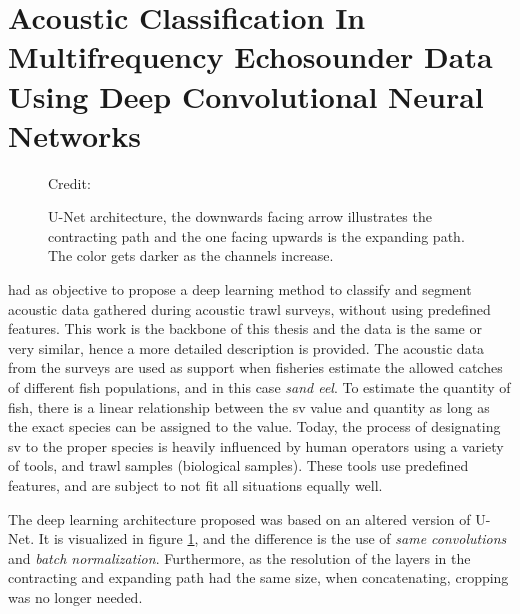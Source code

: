     
\section{Acoustic Classification In Multifrequency Echosounder Data Using Deep Convolutional Neural Networks} \label{unet_paper_acoustic}
    
        \begin{figure}[H]
        \centering
        
        \caption[U-Net architecture]{U-Net architecture, the downwards facing arrow illustrates the contracting path and the one facing upwards is the expanding path. The color gets darker as the channels increase.}
      	\medskip 
        \label{unet__brautset_fig}
        \hspace*{15pt}\hbox{\scriptsize Credit: \citeauthor{brautaset2020acoustic}\cite{brautaset2020acoustic}}
    \end{figure}
    
    
    \citeauthor{brautaset2020acoustic}\cite{brautaset2020acoustic} had as objective to propose a deep learning method to classify and segment acoustic data gathered during acoustic trawl surveys, without using predefined features. This work is the backbone of this thesis and the data is the same or very similar, hence a more detailed description is provided. The acoustic data from the surveys are used as support when fisheries estimate the allowed catches of different fish populations, and in this case \textit{sand eel}. To estimate the quantity of fish, there is a linear relationship between the \gls{sv} value and quantity as long as the exact species can be assigned to the value. Today, the process of designating \gls{sv} to the proper species is heavily influenced by human operators using a variety of tools, and trawl samples (biological samples). These tools use predefined features, and are subject to not fit all situations equally well. 
    
    The deep learning architecture proposed was based on an altered version of \citeauthor{unet_ronneberger2015}\cite{unet_ronneberger2015} U-Net\cite{brautaset2020acoustic}. It is visualized in figure \ref{unet__brautset_fig}, and the difference is the use of \textit{same convolutions} and \textit{batch normalization}. Furthermore, as the resolution of the layers in the contracting and expanding path had the same size, when concatenating, cropping was no longer needed. 
    
